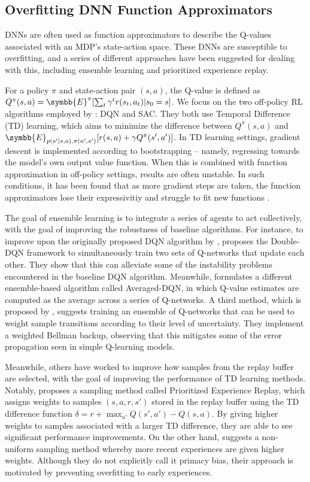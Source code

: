 \documentclass[base]{subfiles}
\begin{document}
\subsection{Overfitting DNN Function Approximators}

DNNs are often used as function approximators to describe the Q-values associated with an MDP's state-action space.
These DNNs are susceptible to overfitting, and a series of different approaches have been suggested for dealing with this, including ensemble learning and prioritized experience replay.

For a policy $\pi$ and state-action pair $(s,a)$, the Q-value is defined as $Q^{\pi} (s, a) = \symbb{E}^{\pi} [ \sum_t \gamma^t r(s_t, a_t) | s_0 = s ]$.
We focus on the two off-policy RL algorithms employed by \cite{kim2023}: DQN and SAC.
They both use Temporal Difference (TD) learning, which aims to minimize the difference between $Q^{\pi}(s,a)$ and $\symbb{E}_{p(s'|s,a), \pi(a',s')} [r(s,a) + \gamma Q^{\pi} (s', a')]$.
In TD learning settings, gradient descent is implemented according to bootstrapping -- namely, regressing towards the model's own output value function.
When this is combined with function approximation in off-policy settings, results are often unstable.
In such conditions, it has been found that as more gradient steps are taken, the function approximators lose their expressivitiy and struggle to fit new functions \cite{kumar2021, lyle2022}.

The goal of ensemble learning is to integrate a series of agents to act collectively, with the goal of improving the robustness of baseline algorithms.
For instance, to improve upon the originally proposed DQN algorithm by \cite{minh2015}, \cite{hasselt2016} proposes the Double-DQN framework to simultaneously train two sets of Q-networks that update each other.
They show that this can alleviate some of the instability problems encountered in the baseline DQN algorithm.
Meanwhile, \cite{anschel2017} formulates a different ensemble-based algorithm called Averaged-DQN, in which Q-value estimates are computed as the average across a series of Q-networks.
A third method, which is proposed by \cite{lee2021}, suggests training an ensemble of Q-networks that can be used to weight sample transitions according to their level of uncertainty.
They implement a weighted Bellman backup, observing that this mitigates some of the error propagation seen in simple Q-learning models.

Meanwhile, others have worked to improve how samples from the replay buffer are selected, with the goal of improving the performance of TD learning methods.
Notably, \cite{schaul2016} proposes a sampling method called Prioritized Experience Replay, which assigns weights to samples $(s, a, r, s')$ stored in the replay buffer using the TD difference function $\delta = r + \max_{a'} Q(s', a') - Q(s,a)$.
By giving higher weights to samples associated with a larger TD difference, they are able to see significant performance improvements.
On the other hand, \cite{wang2020} suggests a non-uniform sampling method whereby more recent experiences are given higher weights.
Although they do not explicitly call it primacy bias, their approach is motivated by preventing overfitting to early experiences.
\end{document}
